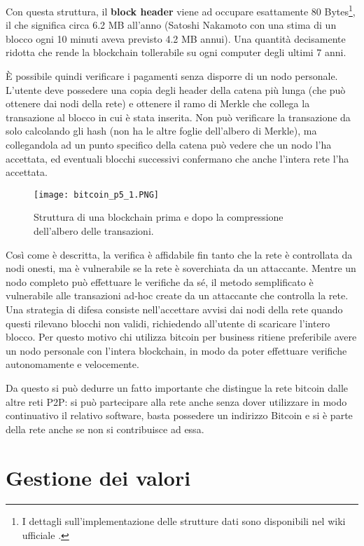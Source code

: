 Con questa struttura, il \textbf{block header} viene ad occupare esattamente 80 Bytes\footnote{I dettagli sull'implementazione delle strutture dati sono disponibili nel wiki ufficiale \cite{bitcoin-protocol}.}, il che significa circa 6.2 MB all'anno (Satoshi Nakamoto con una stima di un blocco ogni 10 minuti aveva previsto 4.2 MB annui). Una quantità decisamente ridotta che rende la blockchain tollerabile su ogni computer degli ultimi 7 anni.

È possibile quindi verificare i pagamenti senza disporre di un nodo personale. L'utente deve possedere una copia degli header della catena più lunga (che può ottenere dai nodi della rete) e ottenere il ramo di Merkle che collega la transazione al blocco in cui è stata inserita. Non può verificare la transazione da solo calcolando gli hash (non ha le altre foglie dell'albero di Merkle), ma collegandola ad un punto specifico della catena può vedere che un nodo l'ha accettata, ed eventuali blocchi successivi confermano che anche l'intera rete l'ha accettata.

\begin{figure}[htbp]
\centering
\texttt{[image: bitcoin\_p5\_1.PNG]}
\caption[Blockchain con blocchi compressi]{Struttura di una blockchain prima e dopo la compressione dell'albero delle transazioni.\label{bitcoin_p5_1}}
\end{figure}

Così come è descritta, la verifica è affidabile fin tanto che la rete è controllata da nodi onesti, ma è vulnerabile se la rete è soverchiata da un attaccante. Mentre un nodo completo può effettuare le verifiche da sé, il metodo semplificato è vulnerabile alle transazioni ad-hoc create da un attaccante che controlla la rete. Una strategia di difesa consiste nell'accettare avvisi dai nodi della rete quando questi rilevano blocchi non validi, richiedendo all'utente di scaricare l'intero blocco. Per questo motivo chi utilizza bitcoin per business ritiene preferibile avere un nodo personale con l'intera blockchain, in modo da poter effettuare verifiche autonomamente e velocemente.

Da questo si può dedurre un fatto importante che distingue la rete bitcoin dalle altre reti P2P: si può partecipare alla rete anche senza dover utilizzare in modo continuativo il relativo software, basta possedere un indirizzo Bitcoin e si è parte della rete anche se non si contribuisce ad essa.

\section{Gestione dei valori}\label{gestione-dei-valori}

